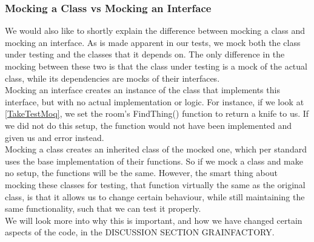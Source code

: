 \subsubsection{Mocking a Class vs Mocking an Interface}
We would also like to shortly explain the difference between mocking a class and mocking an interface. As is made apparent in our tests, we mock both the class under testing and the classes that it depends on. The only difference in the mocking between these two is that the class under testing is a mock of the actual class, while its dependencies are mocks of their interfaces. \\
Mocking an interface creates an instance of the class that implements this interface, but with no actual implementation or logic. For instance, if we look at \autoref{TakeTestMoq}, we set the room's FindThing() function to return a knife to us. If we did not do this setup, the function would not have been implemented and given us and error instead.  \\
Mocking a class creates an inherited class of the mocked one, which per standard uses the base implementation of their functions. So if we mock a class and make no setup, the functions will be the same. However, the smart thing about mocking these classes for testing, that function virtually the same as the original class, is that it allows us to change certain behaviour, while still maintaining the same functionality, such that we can test it properly.  \\
We will look more into why this is important, and how we have changed certain aspects of the code, in the DISCUSSION SECTION GRAINFACTORY. 

